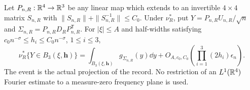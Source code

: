 \begin{lemma}
\label{lem:projected-window-denominator}
Let $P_{n,R}:\mathbb R^4\to\mathbb R^3$ be any linear map which extends to an
invertible $4\times4$ matrix $S_{n,R}$ with
$\|S_{n,R}\|+\|S_{n,R}^{-1}\|\le C_0$. Under $\nu_R^*$, put
$Y=P_{n,R}U_{n,R}/\sqrt n$ and
$\Sigma_{n,R}=P_{n,R}D_RP_{n,R}^{\mathsf T}$.
For $|\xi|\le A$ and half-widths satisfying
$c_0n^{-\sigma}\le h_i\le C_0n^{-\sigma}$, $1\le i\le3$,
\begin{equation}\label{eq:projected-window-denominator}
 \nu_R^*\{Y\in B_3(\xi,\mathbf h)\}
  =\int_{B_3(\xi,\mathbf h)}g_{\Sigma_{n,R}}(y)\dd y
                +O_{A,c_0,C_0}\left(\prod_{i=1}^3(2h_i)\epsilon_n\right).
\end{equation}
The event is the actual projection of the record. No restriction of an
$L^1(\mathbb R^4)$ Fourier estimate to a measure-zero frequency plane is used.
\end{lemma}
